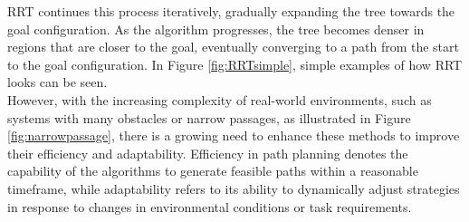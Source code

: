 \documentclass{ctuthesis}
\begin{document}
RRT continues this process iteratively, gradually expanding the tree towards the goal configuration. 
As the algorithm progresses, the tree becomes denser in regions that are closer to the goal, eventually converging to a path from the start to the goal configuration.
In Figure \ref{fig:RRTsimple}, simple examples of how RRT looks can be seen.\\[12pt]
However, with the increasing complexity of real-world environments, 
such as systems with many obstacles or narrow passages, as illustrated in Figure \ref{fig:narrowpassage},
there is a growing need to enhance these methods to improve their efficiency and
adaptability.
Efficiency in path planning denotes the capability of the algorithms to generate feasible paths within a reasonable timeframe, 
while adaptability refers to its ability to dynamically adjust strategies in response to changes in environmental conditions or task requirements.
 
\end{document}
